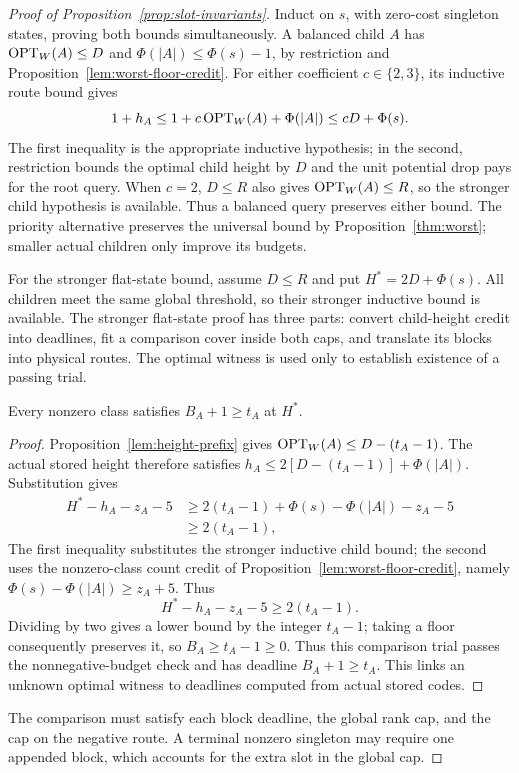 

\begin{proof}[Proof of Proposition~\ref{prop:slot-invariants}]
Induct on $s$, with zero-cost singleton states, proving both bounds
simultaneously. A balanced child $A$ has $\operatorname{OPT}_W(A)\le D$ and
$\Phi(|A|)\le\Phi(s)-1$, by restriction and
Proposition~\ref{lem:worst-floor-credit}. For either coefficient
$c\in\{2,3\}$, its inductive route bound gives
\[
 1+h_A\le1+c\operatorname{OPT}_W(A)+\Phi(|A|)
          \le cD+\Phi(s).
\]
The first inequality is the appropriate inductive hypothesis; in the
second, restriction bounds the optimal child height by $D$ and the
unit potential drop pays for the root query.
When $c=2$, $D\le R$ also gives $\operatorname{OPT}_W(A)\le R$, so the
stronger child hypothesis is available. Thus a balanced query
preserves either bound. The priority alternative
preserves the universal bound by Proposition~\ref{thm:worst}; smaller
actual children only improve its budgets.

For the stronger flat-state bound, assume $D\le R$ and put
$H^*=2D+\Phi(s)$. All children meet the same global threshold, so
their stronger inductive bound is available.
The stronger flat-state proof has three parts: convert child-height
credit into deadlines, fit a comparison cover inside both caps, and
translate its blocks into physical routes. The optimal witness is used
only to establish existence of a passing trial.

\begin{claim}
\label{clm:slot-child-deadlines}
Every nonzero class satisfies $B_A+1\ge t_A$ at $H^*$.
\end{claim}
\begin{proof}
Proposition~\ref{lem:height-prefix} gives $\operatorname{OPT}_W(A)\le D-(t_A-1)$.
The actual stored height therefore satisfies
$h_A\le2[D-(t_A-1)]+\Phi(|A|)$. Substitution gives
\begin{align*}
 H^*-h_A-z_A-5
 &\ge2(t_A-1)+\Phi(s)-\Phi(|A|)-z_A-5\\
 &\ge2(t_A-1),
\end{align*}
The first inequality substitutes the stronger inductive child bound;
the second uses the nonzero-class count credit of
Proposition~\ref{lem:worst-floor-credit}, namely
$\Phi(s)-\Phi(|A|)\ge z_A+5$. Thus
\begin{equation}\label{eq:slot-deadline-credit}
 H^*-h_A-z_A-5\ge2(t_A-1).
\end{equation}
Dividing by two gives a lower bound by the integer $t_A-1$;
taking a floor consequently preserves it, so $B_A\ge t_A-1\ge0$.
Thus this comparison trial passes the nonnegative-budget check and has
deadline $B_A+1\ge t_A$.
This links an unknown optimal witness to deadlines computed from
actual stored codes.
\end{proof}
The comparison must satisfy each block deadline, the global rank cap,
and the cap on the negative route. A terminal nonzero singleton may
require one appended block, which accounts for the extra slot in the
global cap.


\end{proof}

